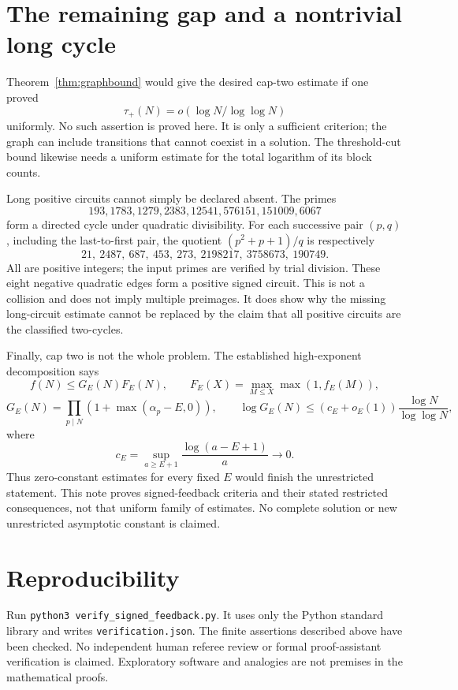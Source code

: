 \documentclass[11pt]{article}
\begin{document}
\section{The remaining gap and a nontrivial long cycle}
Theorem~\ref{thm:graphbound} would give the desired cap-two estimate if one proved
\[
 \tau_+(N)=o(\log N/\log\log N)
\]
uniformly. No such assertion is proved here. It is only a sufficient criterion; the graph can include transitions that cannot coexist in a solution. The threshold-cut bound likewise needs a uniform estimate for the total logarithm of its block counts.

Long positive circuits cannot simply be declared absent. The primes
\[
 193,1783,1279,2383,12541,576151,151009,6067
\]
form a directed cycle under quadratic divisibility. For each successive pair $(p,q)$, including the last-to-first pair, the quotient $(p^2+p+1)/q$ is respectively
\[
 21,\ 2487,\ 687,\ 453,\ 273,\ 2198217,\ 3758673,\ 190749.
\]
All are positive integers; the input primes are verified by trial division. These eight negative quadratic edges form a positive signed circuit. This is not a collision and does not imply multiple preimages. It does show why the missing long-circuit estimate cannot be replaced by the claim that all positive circuits are the classified two-cycles.

Finally, cap two is not the whole problem. The established high-exponent decomposition says
\[
 f(N)\le G_E(N)F_E(N),\qquad
 F_E(X)=\max_{M\le X}\max(1,f_E(M)),
\]
\[
 G_E(N)=\prod_{p\mid N}(1+\max(\alpha_p-E,0)),\qquad
 \log G_E(N)\le(c_E+o_E(1))\frac{\log N}{\log\log N},
\]
where
\[
 c_E=\sup_{a\ge E+1}\frac{\log(a-E+1)}a\longrightarrow0.
\]
Thus zero-constant estimates for every fixed $E$ would finish the unrestricted statement. This note proves signed-feedback criteria and their stated restricted consequences, not that uniform family of estimates. No complete solution or new unrestricted asymptotic constant is claimed.

\section*{Reproducibility}
Run \texttt{python3 verify\_signed\_feedback.py}. It uses only the Python standard library and writes \texttt{verification.json}. The finite assertions described above have been checked. No independent human referee review or formal proof-assistant verification is claimed. Exploratory software and analogies are not premises in the mathematical proofs.
\end{document}
